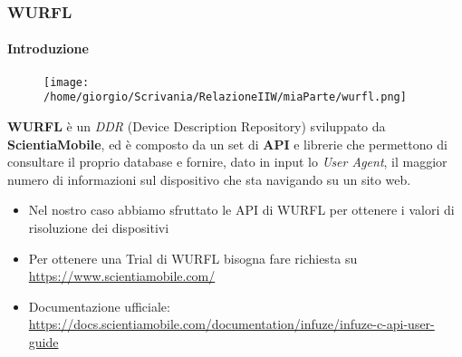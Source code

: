 \documentclass{beamer}
\begin{document}
\begin{frame}
\frametitle{WURFL}
\framesubtitle{Introduzione}

\begin{figure}
    \texttt{[image: /home/giorgio/Scrivania/RelazioneIIW/miaParte/wurfl.png]}
\end{figure}

\textbf{WURFL} è un \textit{DDR} (Device Description Repository) sviluppato da \textbf{ScientiaMobile}, ed è composto da un set di \textbf{API} e librerie che permettono di consultare il proprio database e fornire, dato in input lo \textit{User Agent}, il maggior
numero di informazioni sul dispositivo che sta navigando su un sito web.

\begin{itemize}
\item Nel nostro caso abbiamo sfruttato le API di WURFL per ottenere i valori di risoluzione dei dispositivi
\item Per ottenere una Trial di WURFL bisogna fare richiesta su \href{https://www.scientiamobile.com/}{\color{blue}  https://www.scientiamobile.com/}
\item Documentazione ufficiale: \href{https://docs.scientiamobile.com/documentation/infuze/infuze-c-api-user-guide}{\color{blue}  https://docs.scientiamobile.com/documentation/infuze/infuze-c-api-user-guide}

\end{itemize}
\end{frame}
\end{document}
